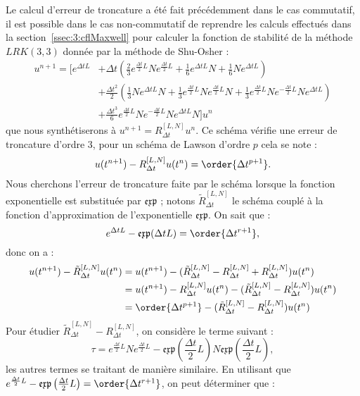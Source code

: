 Le calcul d'erreur de troncature a été fait précédemment dans le cas commutatif, il est possible dans le cas non-commutatif de reprendre les calculs effectués dans la section~\ref{ssec:3:cflMaxwell} pour calculer la fonction de stabilité de la méthode $LRK(3,3)$ donnée par la méthode de Shu-Osher :
\begin{equation}
  \begin{aligned}
    u^{n+1} = \Big[ e^{\Delta tL} &+ \Delta t\left(\frac{2}{3}e^{\frac{\Delta t}{2}L}Ne^{\frac{\Delta t}{2}L}+\frac{1}{6}e^{\Delta tL}N + \frac{1}{6}Ne^{\Delta tL}\right) \\
    & + \frac{\Delta t^2}{2}\left(\frac{1}{3}Ne^{\Delta tL}N + \frac{1}{3}e^{\frac{\Delta t}{2}L}Ne^{\frac{\Delta t}{2}L}N + \frac{1}{3} e^{\frac{\Delta t}{2}L}Ne^{-\frac{\Delta t}{2}L}Ne^{\Delta tL} \right) \\
    & + \frac{\Delta t^3}{6}e^{\frac{\Delta t}{2}L}Ne^{-\frac{\Delta t}{2}L}Ne^{\Delta tL}N \Big]u^n
  \end{aligned}
  \label{eq:3:lrk33:nc}
\end{equation}
\newcommand{\R}{R_{\Delta t}^{[L,N]}}
\newcommand{\tR}{\tilde{R}_{\Delta t}^{[L,N]}}
que nous synthétiserons à $u^{n+1}= \R u^n$. Ce schéma vérifie une erreur de troncature d'ordre 3, pour un schéma de Lawson d'ordre $p$ cela se note :
$$
  u(t^{n+1}) - \R u(t^n) = \order{\Delta t^{p+1}}.
$$
Nous cherchons l'erreur de troncature faite par le schéma lorsque la fonction exponentielle est substituée par $\mathfrak{exp}$ ; notons $\tR$ le schéma couplé à la fonction d'approximation de l'exponentielle $\mathfrak{exp}$. On sait que :
$$
  e^{\Delta t L} - \mathfrak{exp}(\Delta tL) = \order{\Delta t^{r+1}},
$$
donc on a :
$$
  \begin{aligned}
    u(t^{n+1}) - \tR u(t^n) &= u(t^{n+1}) - (\tR-\R+\R)u(t^n) \\
                            &= u(t^{n+1}) - \R u(t^n) - (\tR - \R)u(t^n) \\
                            &= \order{\Delta t^{p+1}} - (\tR - \R)u(t^n)
  \end{aligned}
$$
Pour étudier $\tR-\R$, on considère le terme suivant :
$$
  \tau = e^{\frac{\Delta t}{2}L}Ne^{\frac{\Delta t}{2}L} - \mathfrak{exp}\left(\frac{\Delta t}{2}L\right)N\mathfrak{exp}\left(\frac{\Delta t}{2}L\right),
$$
les autres termes se traitant de manière similaire. En utilisant que $e^{\frac{\Delta t}{2}L}-\mathfrak{exp}\left(\frac{\Delta t}{2}L\right) = \order{\Delta t^{r+1}}$, on peut déterminer que :
